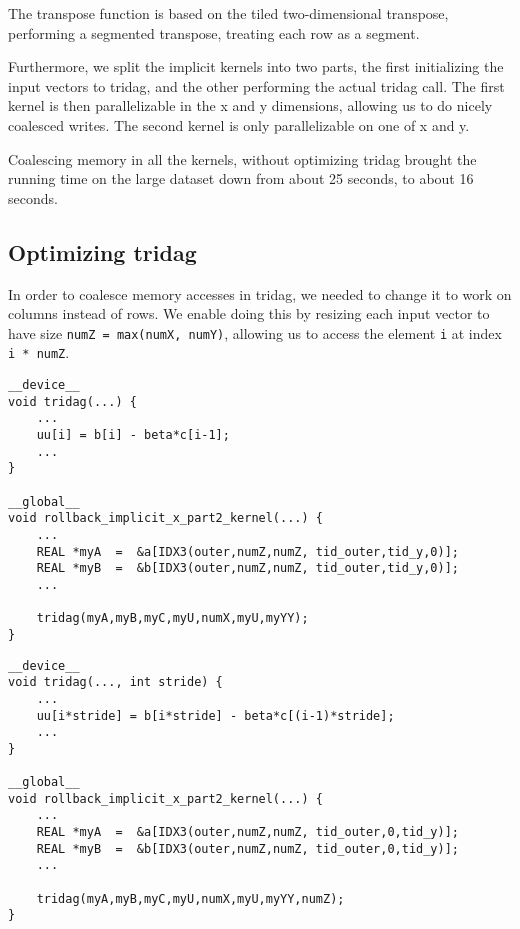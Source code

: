 \documentclass[a4paper]{article}
\begin{document}
The transpose function is based on the tiled two-dimensional transpose,
performing a segmented transpose, treating each row as a segment.

Furthermore, we split the implicit kernels into two parts, the first
initializing the input vectors to tridag, and the other performing the
actual tridag call. The first kernel is then parallelizable in the x and y
dimensions, allowing us to do nicely coalesced writes. The second kernel is
only parallelizable on one of x and y.

Coalescing memory in all the kernels, without optimizing tridag brought the
running time on the large dataset down from about 25 seconds, to about 16
seconds.

\subsection{Optimizing tridag}

In order to coalesce memory accesses in tridag, we needed to change it to
work on columns instead of rows. We enable doing this by resizing each input
vector to have size \texttt{numZ = max(numX, numY)}, allowing us to access the
element \texttt{i} at index \texttt{i * numZ}. 

\begin{lstlisting}[caption={The call to \texttt{tridag} pre-coalescing},label={lst:tridag1}]
__device__
void tridag(...) {
    ...
    uu[i] = b[i] - beta*c[i-1];
    ...
}

__global__
void rollback_implicit_x_part2_kernel(...) {
    ...
    REAL *myA  =  &a[IDX3(outer,numZ,numZ, tid_outer,tid_y,0)];
    REAL *myB  =  &b[IDX3(outer,numZ,numZ, tid_outer,tid_y,0)];
    ...

    tridag(myA,myB,myC,myU,numX,myU,myYY);
}
\end{lstlisting}

\begin{lstlisting}[caption={The call to \texttt{tridag} post-coalescing},label={lst:tridag2}]
__device__
void tridag(..., int stride) {
    ...
    uu[i*stride] = b[i*stride] - beta*c[(i-1)*stride];
    ...
}

__global__
void rollback_implicit_x_part2_kernel(...) {
    ...
    REAL *myA  =  &a[IDX3(outer,numZ,numZ, tid_outer,0,tid_y)];
    REAL *myB  =  &b[IDX3(outer,numZ,numZ, tid_outer,0,tid_y)];
    ...

    tridag(myA,myB,myC,myU,numX,myU,myYY,numZ);
}
\end{lstlisting}
\end{document}
